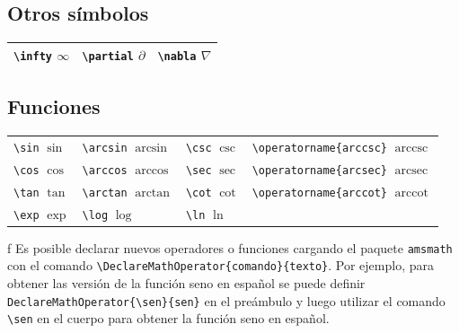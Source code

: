 \documentclass[
  letterpaper,
  DIV=11,
  numbers=noendperiod]{scrreport}
\begin{document}
\hypertarget{otros-suxedmbolos}{%
\subsection{Otros símbolos}\label{otros-suxedmbolos}}

\begin{longtable}[]{@{}lll@{}}
\toprule()
\endhead
\texttt{\textbackslash{}infty} \(\infty\) &
\texttt{\textbackslash{}partial} \(\partial\) &
\texttt{\textbackslash{}nabla} \(\nabla\) \\
\bottomrule()
\end{longtable}

\hypertarget{funciones}{%
\subsection{Funciones}\label{funciones}}

\begin{longtable}[]{@{}
  >{\raggedright\arraybackslash}p{}
  >{\raggedright\arraybackslash}p{}
  >{\raggedright\arraybackslash}p{}
  >{\raggedright\arraybackslash}p{}@{}}
\toprule()
\endhead
\texttt{\textbackslash{}sin} \(\sin\) & \texttt{\textbackslash{}arcsin}
\(\arcsin\) & \texttt{\textbackslash{}csc} \(\csc\) &
\texttt{\textbackslash{}operatorname\{arccsc\}}
\(\operatorname{arccsc}\) \\
\texttt{\textbackslash{}cos} \(\cos\) & \texttt{\textbackslash{}arccos}
\(\arccos\) & \texttt{\textbackslash{}sec} \(\sec\) &
\texttt{\textbackslash{}operatorname\{arcsec\}}
\(\operatorname{arcsec}\) \\
\texttt{\textbackslash{}tan} \(\tan\) & \texttt{\textbackslash{}arctan}
\(\arctan\) & \texttt{\textbackslash{}cot} \(\cot\) &
\texttt{\textbackslash{}operatorname\{arccot\}}
\(\operatorname{arccot}\) \\
\texttt{\textbackslash{}exp} \(\exp\) & \texttt{\textbackslash{}log}
\(\log\) & \texttt{\textbackslash{}ln} \(\ln\) & \\
\bottomrule()
\end{longtable}

f Es posible declarar nuevos operadores o funciones cargando el paquete
\texttt{amsmath} con el comando
\texttt{\textbackslash{}DeclareMathOperator\{comando\}\{texto\}}. Por
ejemplo, para obtener las versión de la función seno en español se puede
definir \texttt{DeclareMathOperator\{\textbackslash{}sen\}\{sen\}} en el
preámbulo y luego utilizar el comando \texttt{\textbackslash{}sen} en el
cuerpo para obtener la función seno en español.
\end{document}
